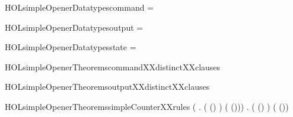 \newcommand{\HOLsimpleOpenerDate}{27 March 2020}
\newcommand{\HOLsimpleOpenerTime}{00:26}
\begin{SaveVerbatim}{HOLsimpleOpenerDatatypescommand}
 =  \HOLTokenBar{} 
\end{SaveVerbatim}
\newcommand{\HOLsimpleOpenerDatatypescommand}{\UseVerbatim{HOLsimpleOpenerDatatypescommand}}
\begin{SaveVerbatim}{HOLsimpleOpenerDatatypesoutput}
 =  \HOLTokenBar{} 
\end{SaveVerbatim}
\newcommand{\HOLsimpleOpenerDatatypesoutput}{\UseVerbatim{HOLsimpleOpenerDatatypesoutput}}
\begin{SaveVerbatim}{HOLsimpleOpenerDatatypesstate}
 =  \HOLTokenBar{} 
\end{SaveVerbatim}
\newcommand{\HOLsimpleOpenerDatatypesstate}{\UseVerbatim{HOLsimpleOpenerDatatypesstate}}
\newcommand{\HOLsimpleOpenerDatatypes}{
\HOLsimpleOpenerDatatypescommand\HOLsimpleOpenerDatatypesoutput\HOLsimpleOpenerDatatypesstate}
\begin{SaveVerbatim}{HOLsimpleOpenerTheoremscommandXXdistinctXXclauses}
\HOLTokenTurnstile{}  \HOLSymConst{\HOLTokenNotEqual{}} 
\end{SaveVerbatim}
\newcommand{\HOLsimpleOpenerTheoremscommandXXdistinctXXclauses}{\UseVerbatim{HOLsimpleOpenerTheoremscommandXXdistinctXXclauses}}
\begin{SaveVerbatim}{HOLsimpleOpenerTheoremsoutputXXdistinctXXclauses}
\HOLTokenTurnstile{}  \HOLSymConst{\HOLTokenNotEqual{}} 
\end{SaveVerbatim}
\newcommand{\HOLsimpleOpenerTheoremsoutputXXdistinctXXclauses}{\UseVerbatim{HOLsimpleOpenerTheoremsoutputXXdistinctXXclauses}}
\begin{SaveVerbatim}{HOLsimpleOpenerTheoremssimpleCounterXXrules}
\HOLTokenTurnstile{} (\HOLSymConst{\HOLTokenForall{}} .
        ( (\HOLSymConst{::})  ) (   (\HOLSymConst{::}))) \HOLSymConst{\HOLTokenConj{}}
   \HOLSymConst{\HOLTokenForall{}} .
       ( (\HOLSymConst{::})  ) (   (\HOLSymConst{::}))
\end{SaveVerbatim}
